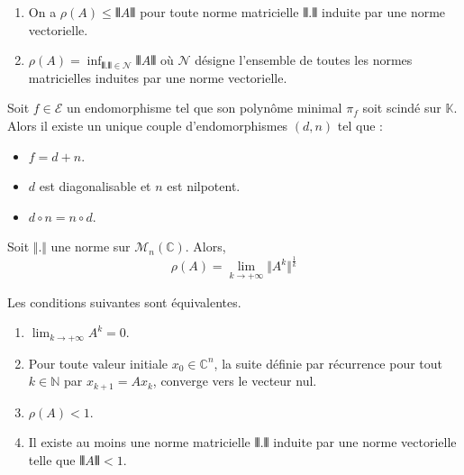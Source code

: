   \begin{theorem}
    \begin{enumerate}[label={\bfseries(\roman*)}]
      \item On a $\rho(A) \leq \VERT A \VERT$ pour toute norme matricielle $\VERT . \VERT$ induite par une norme vectorielle.
      \item $\rho(A) = \inf_{\VERT . \VERT \in \mathcal{N}} \VERT A \VERT$ où $\mathcal{N}$ désigne l'ensemble de toutes les normes matricielles induites par une norme vectorielle.
    \end{enumerate}
  \end{theorem}


  \begin{theorem}
    Soit $f \in \mathcal{E}$ un endomorphisme tel que son polynôme minimal $\pi_f$ soit scindé sur $\mathbb{K}$. Alors il existe un unique couple d'endomorphismes $(d, n)$ tel que :
    \begin{itemize}
      \item $f = d + n$.
      \item $d$ est diagonalisable et $n$ est nilpotent.
      \item $d \circ n = n \circ d$.
    \end{itemize}
  \end{theorem}


  \begin{corollary}
    Soit $\Vert . \Vert$ une norme sur $\mathcal{M}_n(\mathbb{C})$. Alors,
    \[ \rho(A) = \lim_{k \rightarrow +\infty} \Vert A^k \Vert^{\frac{1}{k}} \]
  \end{corollary}

  \begin{proposition}
    Les conditions suivantes sont équivalentes.
    \begin{enumerate}[label={\bfseries(\roman*)}]
      \item $\lim_{k \rightarrow +\infty} A^k = 0$.
      \item Pour toute valeur initiale $x_0 \in \mathbb{C}^n$, la suite définie par récurrence pour tout $k \in \mathbb{N}$ par $x_{k+1} = A x_k$, converge vers le vecteur nul.
      \item $\rho(A) < 1$.
      \item Il existe au moins une norme matricielle $\VERT . \VERT$ induite par une norme vectorielle telle que $\VERT A \VERT < 1$.
    \end{enumerate}
  \end{proposition}

